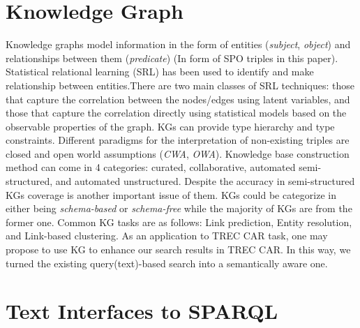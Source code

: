 \documentclass[letterpaper,12pt]{article}
\begin{document}
\section{Knowledge Graph}
Knowledge graphs model information in the form of entities (\textit{subject}, \textit{object}) and relationships between them (\textit{predicate}) (In form of SPO triples in this paper). Statistical relational learning (SRL) has been used to identify and make relationship between entities.There are two main classes of SRL techniques: those that capture the correlation between the nodes/edges using latent variables, and those that capture the correlation directly using statistical models based on the observable properties of the graph. KGs can provide type hierarchy and type constraints. Different paradigms for the interpretation of non-existing triples are closed and open world assumptions (\textit{CWA}, \textit{OWA}). Knowledge base construction method can come in 4 categories: curated, collaborative, automated semi-structured, and automated unstructured. Despite the accuracy in semi-structured KGs coverage is another important issue of them. KGs could be categorize in either being \textit{schema-based} or \textit{schema-free} while the majority of KGs are from the former one. Common KG tasks are as follows: Link prediction, Entity resolution, and Link-based clustering. As an application to TREC CAR task, one may propose to use KG to enhance our search results in TREC CAR. In this way, we turned the existing query(text)-based search into a semantically aware one.

\section{Text Interfaces to SPARQL}
\end{document}
